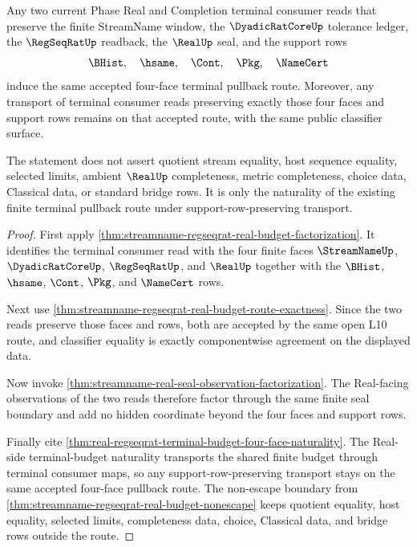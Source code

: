 \begin{theorem}
\label{thm:streamname-regseqrat-real-terminal-pullback-naturality}
Any two current Phase Real and Completion terminal consumer reads that preserve the finite StreamName window, the $\DyadicRatCoreUp$ tolerance ledger, the $\RegSeqRatUp$ readback, the $\RealUp$ seal, and the support rows
$$
\BHist,\quad \hsame,\quad \Cont,\quad \Pkg,\quad \NameCert
$$
induce the same accepted four-face terminal pullback route. Moreover, any transport of terminal consumer reads preserving exactly those four faces and support rows remains on that accepted route, with the same public classifier surface.

The statement does not assert quotient stream equality, host sequence equality, selected limits, ambient $\RealUp$ completeness, metric completeness, choice data, Classical data, or standard bridge rows. It is only the naturality of the existing finite terminal pullback route under support-row-preserving transport.
\end{theorem}
\begin{proof}
First apply \autoref{thm:streamname-regseqrat-real-budget-factorization}. It identifies the terminal consumer read with the four finite faces $\StreamNameUp$, $\DyadicRatCoreUp$, $\RegSeqRatUp$, and $\RealUp$ together with the $\BHist$, $\hsame$, $\Cont$, $\Pkg$, and $\NameCert$ rows.

Next use \autoref{thm:streamname-regseqrat-real-budget-route-exactness}. Since the two reads preserve those faces and rows, both are accepted by the same open L10 route, and classifier equality is exactly componentwise agreement on the displayed data.

Now invoke \autoref{thm:streamname-real-seal-observation-factorization}. The Real-facing observations of the two reads therefore factor through the same finite seal boundary and add no hidden coordinate beyond the four faces and support rows.

Finally cite \autoref{thm:real-regseqrat-terminal-budget-four-face-naturality}. The Real-side terminal-budget naturality transports the shared finite budget through terminal consumer maps, so any support-row-preserving transport stays on the same accepted four-face pullback route. The non-escape boundary from \autoref{thm:streamname-regseqrat-real-budget-nonescape} keeps quotient equality, host equality, selected limits, completeness data, choice, Classical data, and bridge rows outside the route.
\end{proof}


